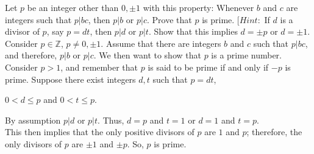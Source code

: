\documentclass[12pt]{article}
\newcommand{\Z}{\mathbb{Z}}
\newenvironment{problem}[2][Problem]{\begin{trivlist}
\item[\hskip \labelsep {\bfseries #1}\hskip \labelsep {\bfseries #2.}]}{\end{trivlist}}
\begin{document}

\begin{problem}{2}
Let $p$ be an integer other than $0, \pm 1$ with this property: Whenever $b$ and $c$ are integers such that $p|bc$, then $p|b$ or $p|c$. Prove that $p$ is prime. [$Hint:$ If $d$ is a divisor of $p$, say $p=dt$, then $p|d$ or $p|t$. Show that this implies $d= \pm p$ or $d= \pm 1$. \\

\noindent
Consider $p \in \Z$, $p \neq 0, \pm 1$. Assume that there are integers $b$ and $c$ such that $p|bc$, and therefore, $p|b$ or $p|c$. We then want to show that $p$ is a prime number. Consider $p>1$, and remember that $p$ is said to be prime if and only if $-p$ is prime. Suppose there exist integers $d, t$ such that $p=dt$, 

\begin{center} 
$0<d \leq p$ and $0<t \leq p$.
\end{center}

\noindent
By assumption $p|d$ or $p|t$. Thus, $d=p$ and $t=1$ or $d=1$ and $t=p$. \\

\noindent
This then implies that the only positive divisors of $p$ are $1$ and $p$; therefore, the only divisors of $p$ are $\pm 1$ and $\pm p$. So, $p$ is prime. \qedsymbol
\end{problem}

\end{document}
